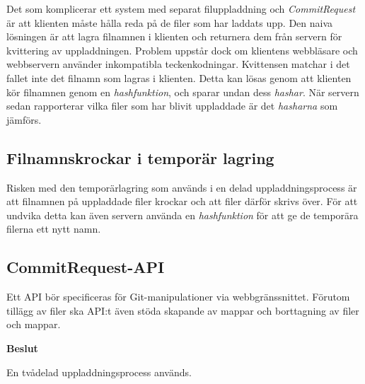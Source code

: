 Det som komplicerar ett system med separat filuppladdning och \emph{CommitRequest} är att klienten måste hålla reda på de filer som har laddats upp. Den naiva lösningen är att lagra filnamnen i klienten och returnera dem från servern för kvittering av uppladdningen. Problem uppstår dock om klientens webbläsare och webbservern använder inkompatibla teckenkodningar. Kvittensen matchar i det fallet inte det filnamn som lagras i klienten. 
Detta kan lösas genom att klienten kör filnamnen genom en \emph{hashfunktion}, och sparar undan dess \emph{hashar}. När servern sedan rapporterar vilka filer som har blivit uppladdade är det \emph{hasharna} som jämförs.

\subsection{Filnamnskrockar i temporär lagring}
Risken med den temporärlagring som används i en delad uppladdningsprocess är att filnamnen på uppladdade filer krockar och att filer därför skrivs över. För att undvika detta kan även servern använda en \emph{hashfunktion} för att ge de temporära filerna ett nytt namn.

\subsection{CommitRequest-API}
Ett API bör specificeras för Git-manipulationer via webbgränssnittet. Förutom tillägg av filer ska API:t även stöda skapande av mappar och borttagning av filer och mappar.

\begin{flushright}
  
  \textbf{Beslut}
  
  En tvådelad uppladdningsprocess används.
  
\end{flushright}
